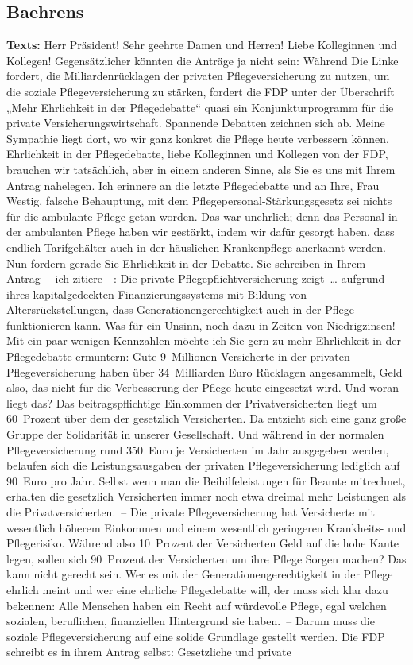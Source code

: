 \documentclass{article}
\begin{document}
\subsection{Baehrens}
\noindent\textbf{Texts:} Herr Präsident! Sehr geehrte Damen und Herren! Liebe Kolleginnen und Kollegen! Gegensätzlicher könnten die Anträge ja nicht sein: Während Die Linke fordert, die Milliardenrücklagen der privaten Pflegeversicherung zu nutzen, um die soziale Pflegeversicherung zu stärken, fordert die FDP unter der Überschrift „Mehr Ehrlichkeit in der Pflegedebatte“ quasi ein Konjunkturprogramm für die private Versicherungswirtschaft.  Spannende Debatten zeichnen sich ab. Meine Sympathie liegt dort, wo wir ganz konkret die Pflege heute verbessern können. Ehrlichkeit in der Pflegedebatte, liebe Kolleginnen und Kollegen von der FDP, brauchen wir tatsächlich, aber in einem anderen Sinne, als Sie es uns mit Ihrem Antrag nahelegen.  Ich erinnere an die letzte Pflegedebatte und an Ihre, Frau Westig, falsche Behauptung, mit dem Pflegepersonal-Stärkungsgesetz sei nichts für die ambulante Pflege getan worden. Das war unehrlich; denn das Personal in der ambulanten Pflege haben wir gestärkt, indem wir dafür gesorgt haben, dass endlich Tarifgehälter auch in der häuslichen Krankenpflege anerkannt werden.  Nun fordern gerade Sie Ehrlichkeit in der Debatte. Sie schreiben in Ihrem Antrag – ich zitiere –: Die private Pflegepflichtversicherung zeigt … aufgrund ihres kapitalgedeckten Finanzierungssystems mit Bildung von Altersrückstellungen, dass Generationengerechtigkeit auch in der Pflege funktionieren kann. Was für ein Unsinn, noch dazu in Zeiten von Niedrigzinsen!  Mit ein paar wenigen Kennzahlen möchte ich Sie gern zu mehr Ehrlichkeit in der Pflegedebatte ermuntern: Gute 9 Millionen Versicherte in der privaten Pflegeversicherung haben über 34 Milliarden Euro Rücklagen angesammelt, Geld also, das nicht für die Verbesserung der Pflege heute eingesetzt wird. Und woran liegt das? Das beitragspflichtige Einkommen der Privatversicherten liegt um 60 Prozent über dem der gesetzlich Versicherten. Da entzieht sich eine ganz große Gruppe der Solidarität in unserer Gesellschaft.  Und während in der normalen Pflegeversicherung rund 350 Euro je Versicherten im Jahr ausgegeben werden, belaufen sich die Leistungsausgaben der privaten Pflegeversicherung lediglich auf 90 Euro pro Jahr. Selbst wenn man die Beihilfeleistungen für Beamte mitrechnet, erhalten die gesetzlich Versicherten immer noch etwa dreimal mehr Leistungen als die Privatversicherten. – Die private Pflegeversicherung hat Versicherte mit wesentlich höherem Einkommen und einem wesentlich geringeren Krankheits- und Pflegerisiko. Während also 10 Prozent der Versicherten Geld auf die hohe Kante legen, sollen sich 90 Prozent der Versicherten um ihre Pflege Sorgen machen? Das kann nicht gerecht sein.  Wer es mit der Generationengerechtigkeit in der Pflege ehrlich meint und wer eine ehrliche Pflegedebatte will, der muss sich klar dazu bekennen: Alle Menschen haben ein Recht auf würdevolle Pflege, egal welchen sozialen, beruflichen, finanziellen Hintergrund sie haben. – Darum muss die soziale Pflegeversicherung auf eine solide Grundlage gestellt werden.  Die FDP schreibt es in ihrem Antrag selbst: Gesetzliche und private 
\end{document}
